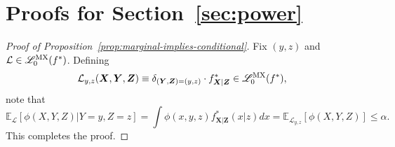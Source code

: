 \documentclass[12pt]{article}
\theoremstyle{definition}
\theoremstyle{remark}
\newcommand{\prx}{\bm X}
\newcommand{\srx}{X}
\newcommand{\prz}{\bm Z}
\newcommand{\srz}{Z}
\newcommand{\sfz}{z}
\newcommand{\pry}{{\bm Y}}
\newcommand{\sry}{Y}
\newcommand{\sfy}{y}
\begin{document}
\printbibliography

\appendix

\section{Proofs for Section~\ref{sec:power}} \label{sec:proofs-sec2}

\begin{proof}[Proof of Proposition~\ref{prop:marginal-implies-conditional}]
	Fix $(y,z)$ and $\mathcal L\in \mathscr L_0^{\textnormal{MX}}(f^*)$. Defining 
	\[
	\mathcal L_{y,z}(\prx, \pry, \prz) \equiv \delta_{(\pry, \prz) = (y,z)} \cdot f^*_{\prx|\prz} \in \mathscr L_0^{\textnormal{MX}}(f^*), 
	\]
	note that
	\begin{equation*}
		\mathbb E_{\mathcal L}[\phi(\srx, \sry, \srz)|\sry = \sfy, \srz = \sfz] = \int \phi(x,y,z)f^*_{\prx|\prz}(x|z)dx = \mathbb E_{\mathcal L_{y,z}}[\phi(\srx, \sry, \srz)] \leq \alpha.
	\end{equation*}
	This completes the proof.
\end{proof}	
\end{document}
